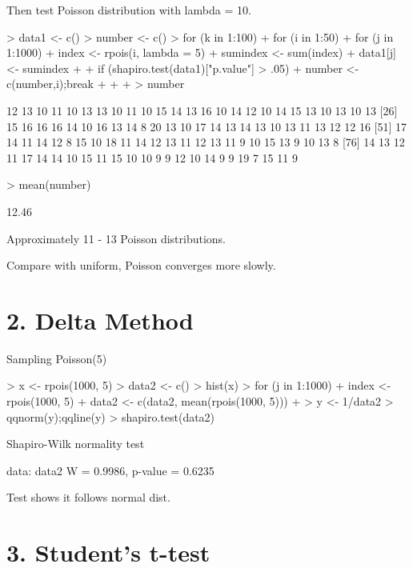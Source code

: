 \documentclass[a4paper]{article}
\begin{document}
Then test Poisson distribution with lambda = 10.

\begin{Schunk}
\begin{Sinput}
> data1 <- c()
> number <- c()
> for (k in 1:100) {
+   for (i in 1:50) {
+     for (j in 1:1000) {
+       index <- rpois(i, lambda = 5)
+       sumindex <- sum(index)
+       data1[j] <- sumindex
+     }
+     if (shapiro.test(data1)["p.value"] > .05) {
+       number <- c(number,i);break
+     }
+   }
+ }
> number
\end{Sinput}
\begin{Soutput}
  [1] 12 13 10 11 10 13 13 10 11 10 15 14 13 16 10 14 12 10 14 15 13 10 13 10 13
 [26] 15 16 16 16 14 10 16 13 14  8 20 13 10 17 14 13 14 13 10 13 11 13 12 12 16
 [51] 17 14 11 14 12  8 15 10 18 11 14 12 13 11 12 13 11  9 10 15 13  9 10 13  8
 [76] 14 13 12 11 17 14 14 10 15 11 15 10 10  9  9 12 10 14  9  9 19  7 15 11  9
\end{Soutput}
\begin{Sinput}
> mean(number)
\end{Sinput}
\begin{Soutput}
[1] 12.46
\end{Soutput}
\end{Schunk}

Approximately 11 - 13 Poisson distributions.

Compare with uniform, Poisson converges more slowly.

\section{2. Delta Method}

Sampling Poisson(5)

\begin{Schunk}
\begin{Sinput}
> x <- rpois(1000, 5)
> data2 <- c()
> hist(x)
> for (j in 1:1000) {
+   index <- rpois(1000, 5)
+   data2 <- c(data2, mean(rpois(1000, 5)))
+   }
> y <- 1/data2
> qqnorm(y);qqline(y)
> shapiro.test(data2)
\end{Sinput}
\begin{Soutput}
	Shapiro-Wilk normality test

data:  data2
W = 0.9986, p-value = 0.6235
\end{Soutput}
\end{Schunk}

Test shows it follows normal dist.

\section{3. Student's t-test}
\end{document}

